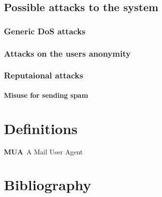 \documentclass[11pt,a4paper]{book}
\newenvironment{entry}{\par\leavevmode\hangpara{1.5mm}{1}\ignorespaces}{\RaggedRight\par}
\newcommand*{\mainentry}[1]{{\bfseries{#1}}~}
\begin{document}
\section{Possible attacks to the system}
\subsection{Generic DoS attacks}
\subsection{Attacks on the users anonymity}
\subsection{Reputaional attacks}
\subsubsection{Misuse for sending spam}

\backmatter
\begin{appendices}
\chapter{Definitions}
\begin{entry}
\mainentry{MUA}{A Mail User Agent}
\end{entry}

\chapter{Bibliography}
\printbibliography[title={},heading=none]
\begin{comment}

\end{comment}
\end{appendices}

\begin{comment}
http://www.rfc-editor.org/pubprocess.html
RFC2223 Instructions to RFC Authors
RFC2119 BCP14 Key words for use in RFCs to Indicate Requirement Levels
RFC3979 BCP79 Intellectual Property Rights in IETF Technology
RFC5378 BCP78 Rights Contributors Provide to the IETF Trust


http://tex.stackexchange.com/questions/36307/formatting-back-references-in-bibliography
http://www.cs.columbia.edu/irt/software/l2x/ l2x -- conversion from LaTeX to other formats Version 1.13
http://ftp.gwdg.de/pub/ctan/support/l2x/
http://tools.ietf.org/tools/xml2rfc2

http://www.zisc.ethz.ch/events/2003-2011/ISC2006Slides/FederrathZISCTalk.pdf

Professorliste
Dr. Christoph Sprenger (Part I)
-Prof. David Basin
Gregory Demay
Peter Gazi
Dr. Srdjan Marinovic
Dr. Sasa Radomirovic
Dr. Ralf Sasse

T. Hoefler
A. Perrig 
-Dr. Jan Camenisch (Keine Berechtigung)

-Srdjan Capkun (Keine Kapazität)
-David Basin  (Keine Kapazität)
\end{comment}
\end{document}
